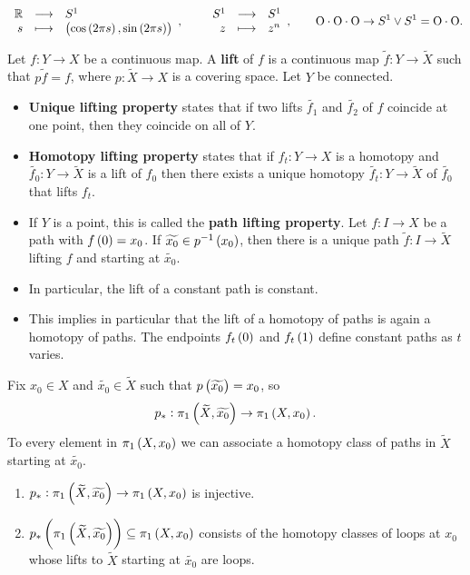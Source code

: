 \begin{example*}
$$ \function{\R}{S^1}{s}{\br{\cos\br{2\pi s}, \sin\br{2\pi s}}}, \qquad \function{S^1}{S^1}{z}{z^n}, \qquad \text{O} \cdot \text{O} \cdot \text{O} \to S^1 \vee S^1 = \text{O} \cdot \text{O}. $$
\end{example*}

Let $ f : Y \to X $ be a continuous map. A \textbf{lift} of $ f $ is a continuous map $ \widetilde{f} : Y \to \widetilde{X} $ such that $ p\widetilde{f} = f $, where $ p : \widetilde{X} \to X $ is a covering space. Let $ Y $ be connected.
\begin{itemize}
\item \textbf{Unique lifting property} states that if two lifts $ \widetilde{f_1} $ and $ \widetilde{f_2} $ of $ f $ coincide at one point, then they coincide on all of $ Y $.
\item \textbf{Homotopy lifting property} states that if $ f_t : Y \to X $ is a homotopy and $ \widetilde{f_0} : Y \to \widetilde{X} $ is a lift of $ f_0 $ then there exists a unique homotopy $ \widetilde{f_t} : Y \to \widetilde{X} $ of $ \widetilde{f_0} $ that lifts $ f_t $.
\end{itemize}

\begin{remark*}
\hfill
\begin{itemize}
\item If $ Y $ is a point, this is called the \textbf{path lifting property}. Let $ f : I \to X $ be a path with $ f\br{0} = x_0 $. If $ \widetilde{x_0} \in p^{-1}\br{x_0} $, then there is a unique path $ \widetilde{f} : I \to \widetilde{X} $ lifting $ f $ and starting at $ \widetilde{x_0} $.
\item In particular, the lift of a constant path is constant.
\item This implies in particular that the lift of a homotopy of paths is again a homotopy of paths. The endpoints $ f_t\br{0} $ and $ f_t\br{1} $ define constant paths as $ t $ varies.
\end{itemize}
\end{remark*}

Fix $ x_0 \in X $ and $ \widetilde{x_0} \in \widetilde{X} $ such that $ p\br{\widetilde{x_0}} = x_0 $, so
$$ p_* : \pi_1\br{\widetilde{X}, \widetilde{x_0}} \to \pi_1\br{X, x_0}. $$
To every element in $ \pi_1\br{X, x_0} $ we can associate a homotopy class of paths in $ \widetilde{X} $ starting at $ \widetilde{x_0} $.

\begin{proposition}
\label{prop:1.31}
\hfill
\begin{enumerate}
\item $ p_* : \pi_1\br{\widetilde{X}, \widetilde{x_0}} \to \pi_1\br{X, x_0} $ is injective.
\item $ p_*\br{\pi_1\br{\widetilde{X}, \widetilde{x_0}}} \subseteq \pi_1\br{X, x_0} $ consists of the homotopy classes of loops at $ x_0 $ whose lifts to $ \widetilde{X} $ starting at $ \widetilde{x_0} $ are loops.
\end{enumerate}
\end{proposition}


